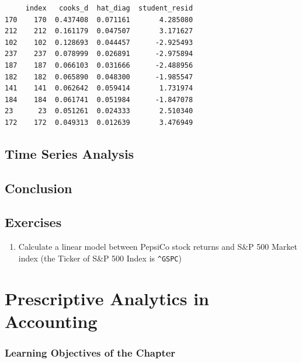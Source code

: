 \documentclass[
  letterpaper,
  DIV=11,
  numbers=noendperiod]{scrreprt}
\providecommand{\tightlist}{%
  \setlength{\itemsep}{0pt}\setlength{\parskip}{0pt}}
\begin{document}
\begin{verbatim}
     index   cooks_d  hat_diag  student_resid
170    170  0.437408  0.071161       4.285080
212    212  0.161179  0.047507       3.171627
102    102  0.128693  0.044457      -2.925493
237    237  0.078999  0.026891      -2.975894
187    187  0.066103  0.031666      -2.488956
182    182  0.065890  0.048300      -1.985547
141    141  0.062642  0.059414       1.731974
184    184  0.061741  0.051984      -1.847078
23      23  0.051261  0.024333       2.510340
172    172  0.049313  0.012639       3.476949
\end{verbatim}

\section{Time Series Analysis}\label{time-series-analysis}

\section{Conclusion}\label{conclusion-1}

\section*{Exercises}\label{exercises-1}


\begin{enumerate}
\def\labelenumi{\arabic{enumi}.}
\tightlist
\item
  Calculate a linear model between PepsiCo stock returns and S\&P 500
  Market index (the Ticker of S\&P 500 Index is \texttt{\^{}GSPC})
\end{enumerate}

\chapter{Prescriptive Analytics in
Accounting}\label{prescriptive-analytics-in-accounting}

\subsection*{Learning Objectives of the
Chapter}\label{learning-objectives-of-the-chapter-7}
\end{document}
